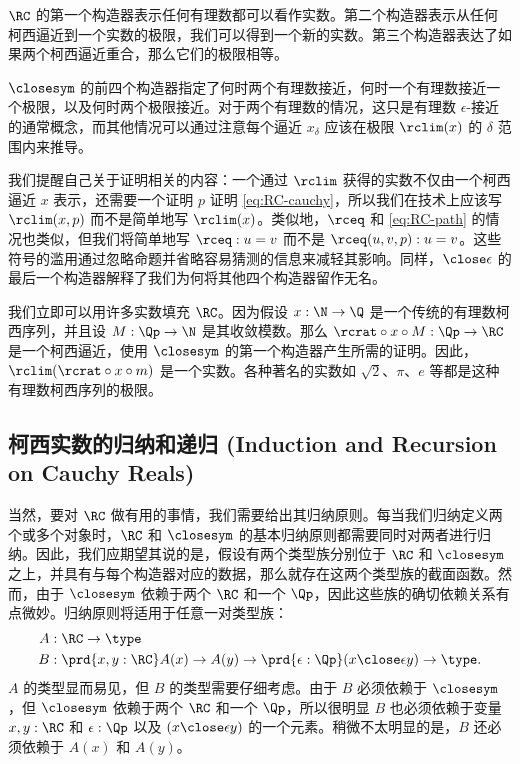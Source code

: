 \mentalpause

$\RC$ 的第一个构造器表示任何有理数都可以看作实数。第二个构造器表示从任何柯西逼近到一个实数的极限，我们可以得到一个新的实数。第三个构造器表达了如果两个柯西逼近重合，那么它们的极限相等。

$\closesym$ 的前四个构造器指定了何时两个有理数接近，何时一个有理数接近一个极限，以及何时两个极限接近。对于两个有理数的情况，这只是有理数 $\epsilon$-接近的通常概念，而其他情况可以通过注意每个逼近 $x_\delta$ 应该在极限 $\rclim(x)$ 的 $\delta$ 范围内来推导。

我们提醒自己关于证明相关的内容：一个通过 $\rclim$ 获得的实数不仅由一个柯西逼近 $x$ 表示，还需要一个证明 $p$ 证明 \eqref{eq:RC-cauchy}，所以我们在技术上应该写 $\rclim(x,p)$ 而不是简单地写 $\rclim(x)$。类似地，$\rceq$ 和 \eqref{eq:RC-path} 的情况也类似，但我们将简单地写 $\rceq : u = v$ 而不是 $\rceq(u, v, p) : u = v$。这些符号的滥用通过忽略命题并省略容易猜测的信息来减轻其影响。同样，$\mathord{\close\epsilon}$ 的最后一个构造器解释了我们为何将其他四个构造器留作无名。

我们立即可以用许多实数填充 $\RC$。因为假设 $x : \N \to \Q$ 是一个传统的有理数柯西序列，并且设 $M : \Qp \to \N$ 是其收敛模数。那么 $\rcrat \circ x \circ M : \Qp \to \RC$ 是一个柯西逼近，使用 $\closesym$ 的第一个构造器产生所需的证明。因此，$\rclim(\rcrat \circ x \circ m)$ 是一个实数。各种著名的实数如 $\sqrt{2}$、$\pi$、$e$ 等都是这种有理数柯西序列的极限。

\subsection{柯西实数的归纳和递归 (Induction and Recursion on Cauchy Reals)}
\label{sec:induct-recurs-cauchy}

当然，要对 $\RC$ 做有用的事情，我们需要给出其归纳原则。每当我们归纳定义两个或多个对象时，$\RC$ 和 $\closesym$ 的基本归纳原则都需要同时对两者进行归纳。因此，我们应期望其说的是，假设有两个类型族分别位于 $\RC$ 和 $\closesym$ 之上，并具有与每个构造器对应的数据，那么就存在这两个类型族的截面函数。然而，由于 $\closesym$ 依赖于两个 $\RC$ 和一个 $\Qp$，因此这些族的确切依赖关系有点微妙。归纳原则将适用于任意一对类型族：
\begin{align*}
  A&:\RC\to\type\\
  B&:\prd{x,y:\RC} A(x) \to A(y) \to \prd{\epsilon:\Qp} (x\close\epsilon y) \to \type.
\end{align*}
$A$ 的类型显而易见，但 $B$ 的类型需要仔细考虑。由于 $B$ 必须依赖于 $\closesym$，但 $\closesym$ 依赖于两个 $\RC$ 和一个 $\Qp$，所以很明显 $B$ 也必须依赖于变量 $x,y:\RC$ 和 $\epsilon:\Qp$ 以及 $(x\close\epsilon y)$ 的一个元素。稍微不太明显的是，$B$ 还必须依赖于 $A(x)$ 和 $A(y)$。


